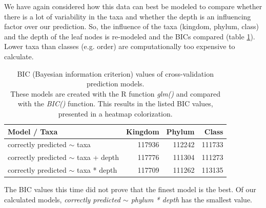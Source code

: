         We have again considered how this data can best be modeled to compare whether there is a lot 
        of variability in the taxa and whether the depth is an influencing factor over our prediction. 
        So, the influence of the taxa (kingdom, phylum, class) and the depth of the leaf nodes is 
        re-modeled and the BICs compared (table \ref{table:BIC cross-validation}). Lower taxa than 
        classes (e.g. order) are computationally too expensive to calculate.


      \begin{table}[h]
        \begin{center}
          \begin{tabular}{ |l|r|r|r| }
            \hline
            \bfseries Model / Taxa & \bfseries Kingdom & \bfseries Phylum & \bfseries Class \\%
            \hline \hline
            correctly predicted $\sim$ taxa & 117936 & \cellcolor{green!40}112242 & \cellcolor{green!50}111733 \\%
            \hline
            correctly predicted $\sim$ taxa + depth & 117776 & \cellcolor{green!50}111304 & \cellcolor{green!50}111273 \\%
            \hline
            correctly predicted $\sim$ taxa * depth & 117709 & \cellcolor{green!50}111262 & \cellcolor{green!30}113135 \\%
            \hline
          \end{tabular} 
        \end{center}
        \caption{BIC (Bayesian information criterion) values of cross-validation prediction models. \\
          These models are created with the R function \textit{glm()} and compared with the 
            \textit{BIC()} function. This results in the listed BIC values, presented in a heatmap colorization.}
        \label{table:BIC cross-validation} 
      \end{table}

      The BIC values this time did not prove that the finest model is the best. Of our calculated models, 
       \textit{correctly predicted $\sim$ phylum * depth} has the smallest value. \\

